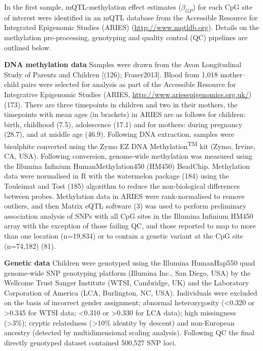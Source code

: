 \documentclass[11pt,oneside]{bristolthesis}
\begin{document}
In the first sample, mQTL-methylation effect estimates (\(\beta_{GP}\)) for each CpG site of interest were identified in an mQTL database from the Accessible Resource for Integrated Epigenomic Studies (ARIES) (\url{http://www.mqtldb.org}). Details on the methylation pre-processing, genotyping and quality control (QC) pipelines are outlined below.

\textbf{DNA methylation data}
Samples were drawn from the Avon Longitudinal Study of Parents and Children {[}(126); Fraser2013{]}. Blood from 1,018 mother--child pairs were selected for analysis as part of the Accessible Resource for Integrative Epigenomic Studies (ARIES, \url{http://www.ariesepigenomics.org.uk/}) (173). There are three timepoints in children and two in their mothers, the timepoints with mean ages (in brackets) in ARIES are as follows for children: birth, childhood (7.5), adolescence (17.1) and for mothers: during pregnancy (28.7), and at middle age (46.9). Following DNA extraction, samples were bisulphite converted using the Zymo EZ DNA Methylation\textsuperscript{TM} kit (Zymo, Irvine, CA, USA). Following conversion, genome-wide methylation was measured using the Illumina Infinium HumanMethylation450 (HM450) BeadChip. Methylation data were normalised in R with the watermelon package (184) using the Touleimat and Tost (185) algorithm to reduce the non-biological differences between probes. Methylation data in ARIES were rank-normalised to remove outliers, and then Matrix eQTL software (3) was used to perform preliminary association analysis of SNPs with all CpG sites in the Illumina Infinium HM450 array with the exception of those failing QC, and those reported to map to more than one location (n=19,834) or to contain a genetic variant at the CpG site (n=74,182) (81).

\textbf{Genetic data}
Children were genotyped using the Illumina HumanHap550 quad genome-wide SNP genotyping platform (Illumina Inc., San Diego, USA) by the Wellcome Trust Sanger Institute (WTSI, Cambridge, UK) and the Laboratory Corporation of America (LCA, Burlington, NC, USA). Individuals were excluded on the basis of incorrect gender assignment; abnormal heterozygosity (\textless0.320 or \textgreater0.345 for WTSI data; \textless0.310 or \textgreater0.330 for LCA data); high missingness (\textgreater3\%); cryptic relatedness (\textgreater10\% identity by descent) and non-European ancestry (detected by multidimensional scaling analysis). Following QC the final directly genotyped dataset contained 500,527 SNP loci.
\end{document}
